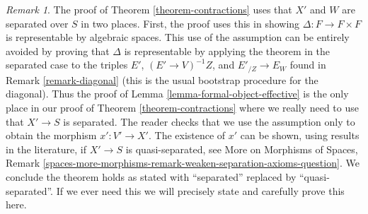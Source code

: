 \documentclass{stacks-project}
\theoremstyle{plain}
\theoremstyle{definition}
\theoremstyle{remark}
\newtheorem{remark}[subsection]{Remark}
\numberwithin{equation}{subsection}
\begin{document}
\begin{remark}
\label{remark-separated-needed}
The proof of Theorem \ref{theorem-contractions} uses that $X'$ and $W$
are separated over $S$ in two places. First, the proof uses this in showing
$\Delta : F \to F \times F$ is representable by algebraic spaces.
This use of the assumption can be entirely avoided by proving
that $\Delta$ is representable by applying the theorem in the
separated case to the triples
$E'$, $(E' \to V)^{-1}Z$, and $E'_{/Z} \to E_W$
found in Remark \ref{remark-diagonal} (this is the usual bootstrap
procedure for the diagonal). Thus the proof of
Lemma \ref{lemma-formal-object-effective} is the only
place in our proof of Theorem \ref{theorem-contractions}
where we really need to use that $X' \to S$ is separated.
The reader checks that we use the assumption only to obtain
the morphism $x' : V' \to X'$. The existence of $x'$ can be shown,
using results in the literature, if $X' \to S$ is quasi-separated, see
More on Morphisms of Spaces, Remark
\ref{spaces-more-morphisms-remark-weaken-separation-axioms-question}.
We conclude the theorem holds as stated with
``separated'' replaced by ``quasi-separated''. If we ever need this
we will precisely state and carefully prove this here.
\end{remark}



















\end{document}
